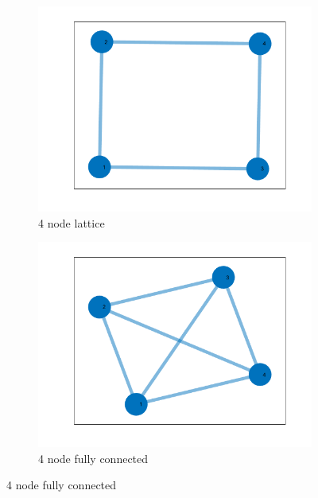 \documentclass[12pt]{article}
\begin{document}
\begin{figure}[h]
    \centering

    \begin{subfigure}[b]{0.2\linewidth}
        \centering
        \includegraphics[width=\textwidth]{Chaos Stuff/4n_lattice.png}
        \caption{4 node lattice}
        \label{fig: 4 node lattice}
    \end{subfigure}
    \hfill
    \begin{subfigure}[b]{0.2\linewidth}
        \centering
        \includegraphics[width=\textwidth]{Chaos Stuff/4n_full.png}
        \caption{4 node fully connected}
        \label{fig: 4 node full}
    \end{subfigure}
    \hfill

\end{figure}
\end{document}

